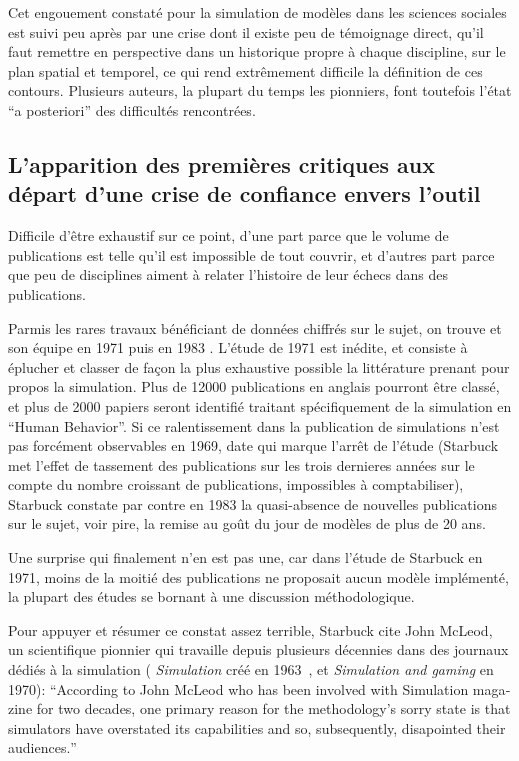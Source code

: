 Cet engouement constaté pour la simulation de modèles dans les sciences sociales est suivi peu après par une crise dont il existe peu de témoignage direct, qu'il faut remettre en perspective dans un historique propre à chaque discipline, sur le plan spatial et temporel, ce qui rend extrêmement difficile la définition de ces contours. Plusieurs auteurs, la plupart du temps les pionniers, font toutefois l'état \foreignquote{latin}{a posteriori} des difficultés rencontrées.


\subsection{L'apparition des premières critiques aux départ d'une crise de confiance envers l'outil }

Difficile d'être exhaustif sur ce point, d'une part parce que le volume de publications est telle qu'il est impossible de tout couvrir, et d'autres part parce que peu de disciplines aiment à relater l'histoire de leur échecs dans des publications.

Parmis les rares travaux bénéficiant de données chiffrés sur le sujet, on trouve \textcite{Dutton1971} et son équipe en 1971  puis \textcite{Starbuck1983} en 1983 . L'étude de 1971 est inédite, et consiste à éplucher et classer de façon la plus exhaustive possible la littérature prenant pour propos la simulation. Plus de 12000 publications en anglais pourront être classé, et plus de 2000 papiers seront identifié traitant spécifiquement de la simulation en \foreignquote{english}{Human Behavior}. Si ce ralentissement dans la publication de simulations n'est pas forcément observables en 1969, date qui marque l'arrêt de l'étude (Starbuck met l'effet de tassement des publications sur les trois dernieres années sur le compte du nombre croissant de publications, impossibles à comptabiliser), Starbuck constate par contre en 1983 la quasi-absence de nouvelles publications sur le sujet, voir pire, la remise au goût du jour de modèles de plus de 20 ans.

Une surprise qui finalement n'en est pas une, car dans l'étude de Starbuck en 1971, moins de la moitié des publications ne proposait aucun modèle implémenté, la plupart des études se bornant à une discussion méthodologique.

Pour appuyer et résumer ce constat assez terrible, Starbuck cite John McLeod, un scientifique pionnier qui travaille depuis plusieurs décennies dans des journaux dédiés à la simulation ( \textit{Simulation} créé en 1963 , et \textit{Simulation and gaming} en 1970): \foreignquote{english}{According to  John McLeod who has been involved with Simulation magazine for two decades, one primary reason for the methodology's sorry state is that simulators have overstated its capabilities and so, subsequently, disapointed their audiences.}

